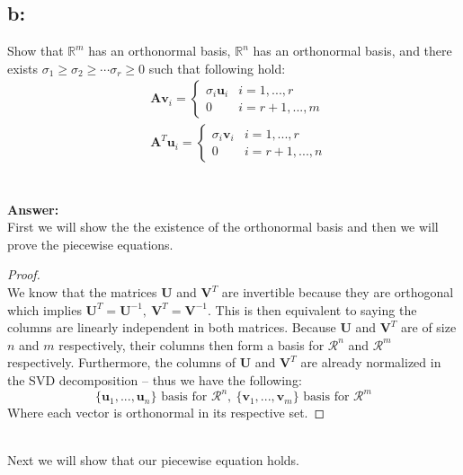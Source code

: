 \documentclass[]{article}
\begin{document}
	\subsection*{b:}
	Show that $\mathbb{R}^m$ has an orthonormal basis, $\mathbb{R}^n$ has an orthonormal basis, and there exists $\sigma_1\geq\sigma_2\geq\cdots\sigma_r\geq0$ such that following hold:
	\begin{align*}
		&\mathbf{A}\mathbf{v}_i=
		\begin{cases}
			\sigma_i\mathbf{u}_i & i=1,...,r\\
			0 & i=r+1,...,m	
		\end{cases}\\
		&\mathbf{A}^T\mathbf{u}_i=
		\begin{cases}
		\sigma_i\mathbf{v}_i & i=1,...,r\\
		0 & i=r+1,...,n	
		\end{cases}
	\end{align*}
	\\~\\
	\textbf{Answer:}\\
	First we will show the the existence of the orthonormal basis and then we will prove the piecewise equations.
	\begin{proof}~\\
		We know that the matrices $\mathbf{U}$ and $\mathbf{V}^T$ are invertible because they are orthogonal which implies $\mathbf{U}^T=\mathbf{U}^{-1},\:\mathbf{V}^T=\mathbf{V}^{-1}$. This is then equivalent to saying the columns are linearly independent in both matrices. Because $\mathbf{U}$ and $\mathbf{V}^T$ are of size $n$ and $m$ respectively, their columns then form a basis for $\mathcal{R}^n$ and $\mathcal{R}^m$ respectively. Furthermore, the columns of $\mathbf{U}$ and $\mathbf{V}^T$ are already normalized in the SVD decomposition -- thus we have the following:
		\[\{\mathbf{u}_1,...,\mathbf{u}_n\}\text{ basis for }\mathcal{R}^n,\:\{\mathbf{v}_1,...,\mathbf{v}_m\}\text{ basis for }\mathcal{R}^m\]
		Where each vector is orthonormal in its respective set.
	\end{proof}~\\
	Next we will show that our piecewise equation holds.
		
\end{document}
